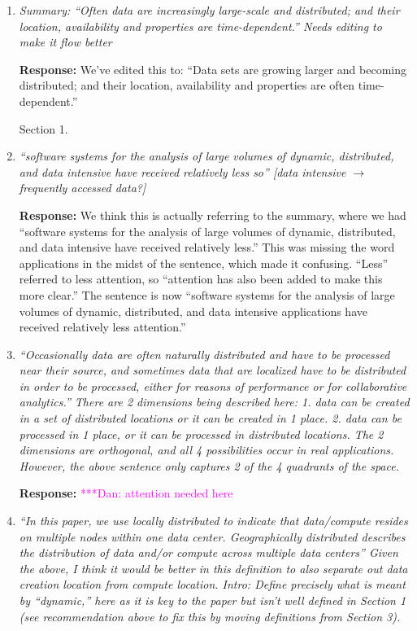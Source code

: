 \documentclass{article}
\newcommand{\katznote}[1]{{\textcolor{magenta} { ***Dan: #1 }}}
\newcommand{\katznote}[1]{}
\begin{document}
\begin{enumerate}

\item \emph{Summary: ``Often data are increasingly large-scale and distributed; and their location, availability and properties are time-dependent.'' Needs editing to make it flow better}

\textbf{Response:} We've edited this to: ``Data sets are growing larger and becoming distributed; and their location, availability and properties are often time-dependent.''

\hspace{-0.7cm}Section 1. 

\item \emph{``software systems for the analysis of large volumes of dynamic, distributed, and data intensive have received relatively less so'' [data intensive $\rightarrow$ frequently accessed data?]}

\textbf{Response:} We think this is actually referring to the summary, where we had ``software systems for the analysis of large volumes of dynamic, distributed, and data intensive have received relatively less.''  This was missing the word applications in the midst of the sentence, which made it confusing. ``Less'' referred to less attention, so ``attention has also been added to make this more clear.'' The sentence is now ``software systems for the analysis of large volumes of dynamic, distributed, and data intensive applications have received relatively less attention.''

\item \emph{``Occasionally data are often naturally distributed and have to be processed near their source, and sometimes data that are localized have to be distributed in order to be processed, either for reasons of performance or for collaborative analytics.'' There are 2 dimensions being described here: 1. data can be created in a set of distributed locations or it can be created in 1 place. 2. data can be processed in 1 place, or it can be processed in distributed locations. The 2 dimensions are orthogonal, and all 4 possibilities occur in real applications. However, the above sentence only captures 2 of the 4 quadrants of the space.}

\textbf{Response:} \katznote{attention needed here}

\item \emph{``In this paper, we use locally distributed to indicate that data/compute resides on multiple nodes within one data center. Geographically distributed describes the distribution of data and/or compute across multiple data centers'' Given the above, I think it would be better in this definition to also separate out data creation location from compute location. Intro: Define precisely what is meant by ``dynamic,'' here as it is key to the paper but isn't well defined in Section 1 (see recommendation above to fix this by moving definitions from Section 3).}


\end{enumerate}
\end{document}
